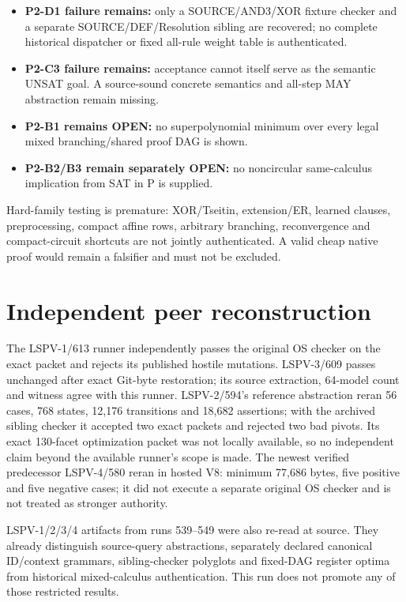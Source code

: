 \documentclass[11pt]{article}
\begin{document}
\begin{itemize}
\item \textbf{P2-D1 failure remains:} only a SOURCE/AND3/XOR fixture checker
      and a separate SOURCE/DEF/Resolution sibling are recovered; no complete
      historical dispatcher or fixed all-rule weight table is authenticated.
\item \textbf{P2-C3 failure remains:} acceptance cannot itself serve as the
      semantic UNSAT goal.  A source-sound concrete semantics and all-step MAY
      abstraction remain missing.
\item \textbf{P2-B1 remains OPEN:} no superpolynomial minimum over every legal
      mixed branching/shared proof DAG is shown.
\item \textbf{P2-B2/B3 remain separately OPEN:} no noncircular same-calculus
      implication from SAT in P is supplied.
\end{itemize}

Hard-family testing is premature: XOR/Tseitin, extension/ER, learned clauses,
preprocessing, compact affine rows, arbitrary branching, reconvergence and
compact-circuit shortcuts are not jointly authenticated.  A valid cheap
native proof would remain a falsifier and must not be excluded.

\section{Independent peer reconstruction}

The LSPV-1/613 runner independently passes the original OS checker on the exact
packet and rejects its published hostile mutations.  LSPV-3/609 passes
unchanged after exact Git-byte restoration; its source extraction, 64-model
count and witness agree with this runner.  LSPV-2/594's reference abstraction
reran 56 cases, 768 states, 12,176 transitions and 18,682 assertions; with the
archived sibling checker it accepted two exact packets and rejected two bad
pivots.  Its exact 130-facet optimization packet was not locally available, so
no independent claim beyond the available runner's scope is made.  The newest
verified predecessor LSPV-4/580 reran in hosted V8: minimum 77,686 bytes, five
positive and five negative cases; it did not execute a separate original OS
checker and is not treated as stronger authority.

LSPV-1/2/3/4 artifacts from runs 539--549 were also re-read at source.  They
already distinguish source-query abstractions, separately declared canonical
ID/context grammars, sibling-checker polyglots and fixed-DAG register optima
from historical mixed-calculus authentication.  This run does not promote any
of those restricted results.
\end{document}

